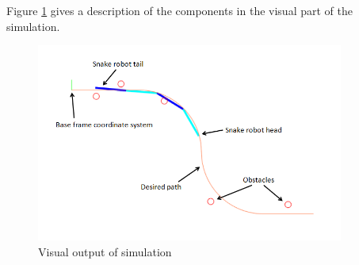 Figure \ref{fig:sim_vis} gives a description of the components in the visual part of the simulation.

\begin{figure}[h!]
    \centering
    \includegraphics[width=0.9\textwidth]{figures/sim_vis.png}
    \caption{Visual output of simulation}
    \label{fig:sim_vis}
\end{figure}

